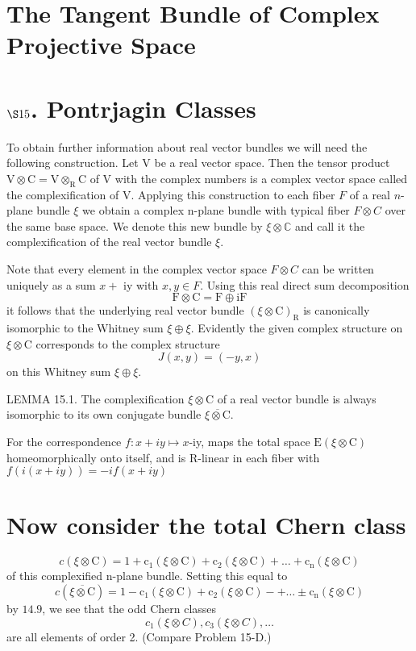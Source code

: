 \documentclass[10pt]{article}
\begin{document}
\section{The Tangent Bundle of Complex Projective Space}

\section{$\S 15$. Pontrjagin Classes}
To obtain further information about real vector bundles we will need the following construction. Let $\mathrm{V}$ be a real vector space. Then the tensor product $\mathrm{V} \otimes \mathrm{C}=\mathrm{V} \otimes_{\mathrm{R}} \mathrm{C}$ of $\mathrm{V}$ with the complex numbers is a complex vector space called the complexification of $\mathrm{V}$. Applying this construction to each fiber $F$ of a real $n$-plane bundle $\xi$ we obtain a complex n-plane bundle with typical fiber $F \otimes C$ over the same base space. We denote this new bundle by $\xi \otimes \mathbb{C}$ and call it the complexification of the real vector bundle $\xi$.

Note that every element in the complex vector space $F \otimes C$ can be written uniquely as a sum $x+$ iy with $x, y \in F$. Using this real direct sum decomposition
$$
\mathrm{F} \otimes \mathrm{C}=\mathrm{F} \oplus \mathrm{iF}
$$
it follows that the underlying real vector bundle $(\xi \otimes \mathrm{C})_{\mathrm{R}}$ is canonically isomorphic to the Whitney sum $\xi \oplus \xi$. Evidently the given complex structure on $\xi \otimes \mathrm{C}$ corresponds to the complex structure
$$
J(x, y)=(-y, x)
$$
on this Whitney sum $\xi \oplus \xi$.

LEMMA 15.1. The complexification $\xi \otimes \mathrm{C}$ of a real vector bundle is always isomorphic to its own conjugate bundle $\overline{\xi \otimes \mathrm{C}}$.

For the correspondence $f: x+i y \mapsto x$-iy, maps the total space $\mathrm{E}(\xi \otimes \mathrm{C})$ homeomorphically onto itself, and is $\mathrm{R}$-linear in each fiber with $f(i(x+i y))=-i f(x+i y)$

\section{Now consider the total Chern class}
$$
c(\xi \otimes \mathrm{C})=1+\mathrm{c}_{1}(\xi \otimes \mathrm{C})+\mathrm{c}_{2}(\xi \otimes \mathrm{C})+\ldots+\mathrm{c}_{\mathrm{n}}(\xi \otimes \mathrm{C})
$$
of this complexified $\mathrm{n}$-plane bundle. Setting this equal to
$$
c(\overline{\xi \otimes \mathrm{C}})=1-\mathrm{c}_{1}(\xi \otimes \mathrm{C})+\mathrm{c}_{2}(\xi \otimes \mathrm{C})-+\ldots \pm \mathrm{c}_{\mathrm{n}}(\xi \otimes \mathrm{C})
$$
by $14.9$, we see that the odd Chern classes
$$
c_{1}(\xi \otimes C), c_{3}(\xi \otimes C), \ldots
$$
are all elements of order 2. (Compare Problem 15-D.)
\end{document}
